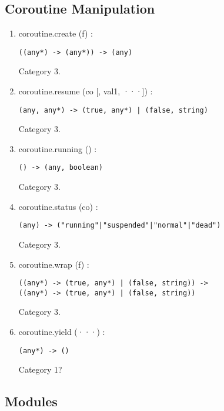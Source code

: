 \documentclass{paper}
\begin{document}
\subsection{Coroutine Manipulation}

\begin{enumerate}
\item coroutine.create (f) :
\begin{verbatim}
((any*) -> (any*)) -> (any)
\end{verbatim}
Category 3.
\item coroutine.resume (co [, val1, ···]) :
\begin{verbatim}
(any, any*) -> (true, any*) | (false, string)
\end{verbatim}
Category 3.
\item coroutine.running () :
\begin{verbatim}
() -> (any, boolean)
\end{verbatim}
Category 3.
\item coroutine.status (co) :
\begin{verbatim}
(any) -> ("running"|"suspended"|"normal"|"dead")
\end{verbatim}
Category 3.
\item coroutine.wrap (f) :
\begin{verbatim}
((any*) -> (true, any*) | (false, string)) ->
((any*) -> (true, any*) | (false, string))
\end{verbatim}
Category 3.
\item coroutine.yield (···) :
\begin{verbatim}
(any*) -> ()
\end{verbatim}
Category 1?
\end{enumerate}

\subsection{Modules}
\end{document}
